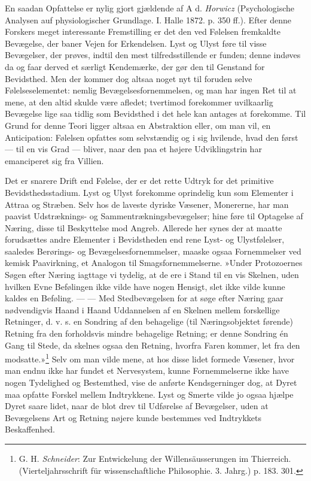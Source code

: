 \documentclass[12pt,a4paper,openany]{book}
\newcommand{\opage}[1]{\marginnote{\footnotesize\textit{[#1]}}}
\begin{document}
En saadan Opfattelse er nylig gjort gjældende af A d. \emph{Horwicz}
(Psychologische Analysen auf physiologischer Grundlage. I. Halle 1872.
p. 350 ff.). Efter denne Forskers meget interessante Fremstilling er det
den ved Følelsen fremkaldte Bevægelse, der baner Vejen for Erkendelsen.
Lyst og Ulyst føre til visse Bevægelser, der prøves, indtil den mest
tilfredsstillende er funden; denne indøves da og faar derved et særligt
Kendemærke, der gør den til Genstand for Bevidsthed. Men der kommer dog
altsaa noget nyt til foruden selve Følelseselementet: nemlig
Bevægelsesfornemmelsen, og man har ingen Ret til at mene, at den altid
skulde være afledet; tvertimod forekommer uvilkaarlig Bevægelse lige saa
tidlig som Bevidsthed i det hele kan antages at forekomme. Til Grund for
denne Teori ligger altsaa en Abstraktion eller, om man vil, en
Anticipation: Følelsen opfattes som selvstændig og i sig hvilende, hvad
den først --- til en vis Grad --- bliver, naar den paa et højere
Udviklingstrin har emanciperet sig fra Villien.


\opage{115}Det er snarere Drift end Følelse, der er det rette Udtryk for
det primitive Bevidsthedsstadium. Lyst og Ulyst forekomme oprindelig kun
som Elementer i Attraa og Stræben. Selv hos de laveste dyriske Væsener,
Monererne, har man paavist Udstræknings- og Sammentrækningsbevægelser;
hine føre til Optagelse af Næring, disse til Beskyttelse mod Angreb.
Allerede her synes der at maatte forudsættes andre Elementer i
Bevidstheden end rene Lyst- og Ulystfølelser, saaledes Berørings- og
Bevægelsesfornemmelser, maaske ogsaa Fornemmelser ved kemisk
Paavirkning, et Analogon til Smagsfornemmelserne. »Under Protozoernes
Søgen efter Næring iagttage vi tydelig, at de ere i Stand til en vis
Skelnen, uden hvilken Evne Befølingen ikke vilde have nogen Hensigt,
slet ikke vilde kunne kaldes en Beføling. --- --- Med Stedbevægelsen for
at søge efter Næring gaar nødvendigvis Haand i Haand Uddannelsen af en
Skelnen mellem forskellige Retninger, d. v. s. en Sondring af den
behagelige (til Næringsobjektet førende) Retning fra den forholdsvis
mindre behagelige Retning; er denne Sondring én Gang til Stede, da
skelnes ogsaa den Retning, hvorfra Faren kommer, let fra den
modsatte.»\footnote[1]{G. H. \emph{Schneider}: Zur Entwickelung der
Willensäusserungen im Thierreich. (Vierteljahrsschrift für
wissenschaftliche Philosophie. 3. Jahrg.) p. 183. 301.} Selv om man
vilde mene, at hos disse lidet formede Væsener, hvor man endnu ikke har
fundet et Nervesystem, kunne Fornemmelserne ikke have nogen Tydelighed
og Bestemthed, vise de anførte Kendsgerninger dog, at Dyret maa opfatte
Forskel mellem Indtrykkene. Lyst og Smerte vilde jo ogsaa hjælpe Dyret
saare lidet, naar de blot drev til Udførelse af Bevægelser, uden at
Bevægelsens Art og Retning nøjere kunde bestemmes ved Indtrykkets
Beskaffenhed.
\end{document}
